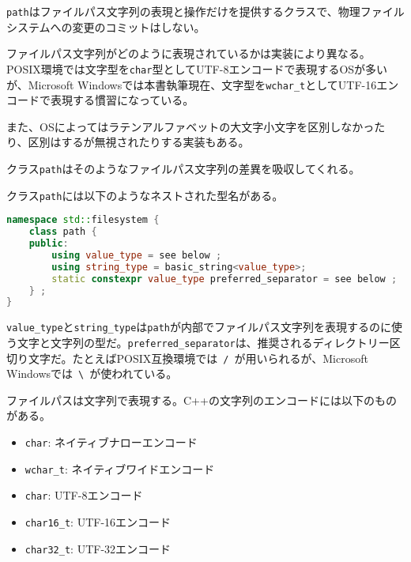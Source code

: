 \lstinline!path!はファイルパス文字列の表現と操作だけを提供するクラスで、物理ファイルシステムへの変更のコミットはしない。

ファイルパス文字列がどのように表現されているかは実装により異なる。POSIX環境では文字型を\lstinline!char!型としてUTF-8エンコードで表現するOSが多いが、Microsoft
Windowsでは本書執筆現在、文字型を\lstinline!wchar_t!としてUTF-16エンコードで表現する慣習になっている。

また、OSによってはラテンアルファベットの大文字小文字を区別しなかったり、区別はするが無視されたりする実装もある。

クラス\lstinline!path!はそのようなファイルパス文字列の差異を吸収してくれる。

クラス\lstinline!path!には以下のようなネストされた型名がある。

\begin{lstlisting}[language=C++]
namespace std::filesystem {
    class path {
    public:
        using value_type = see below ;
        using string_type = basic_string<value_type>;
        static constexpr value_type preferred_separator = see below ;
    } ;
}
\end{lstlisting}

\lstinline!value_type!と\lstinline!string_type!は\lstinline!path!が内部でファイルパス文字列を表現するのに使う文字と文字列の型だ。\lstinline!preferred_separator!は、推奨されるディレクトリー区切り文字だ。たとえばPOSIX互換環境では~\lstinline!/!~が用いられるが、Microsoft
Windowsでは~\lstinline!\!~が使われている。

%

ファイルパスは文字列で表現する。C++の文字列のエンコードには以下のものがある。

\begin{itemize}
\itemsep1pt\parskip0pt
\item
  \lstinline!char!: ネイティブナローエンコード
\item
  \lstinline!wchar_t!: ネイティブワイドエンコード
\item
  \lstinline!char!: UTF-8エンコード
\item
  \lstinline!char16_t!: UTF-16エンコード
\item
  \lstinline!char32_t!: UTF-32エンコード
\end{itemize}

